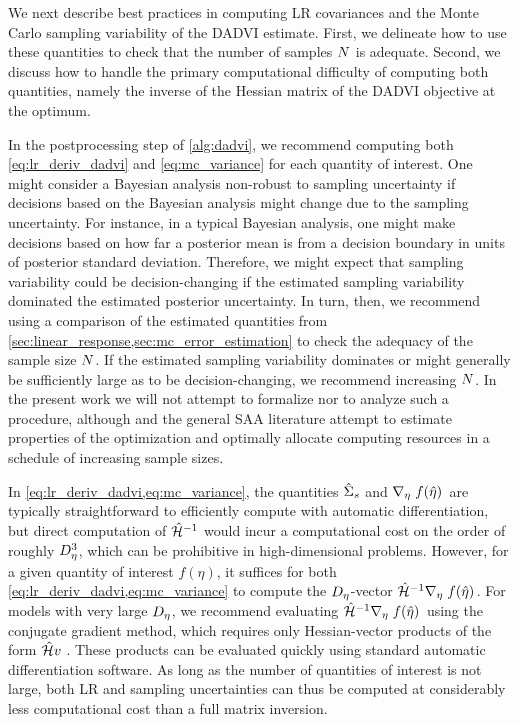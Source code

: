We next describe best practices in computing LR covariances and the Monte Carlo
sampling variability of the DADVI estimate.  First, we delineate how to use
these quantities to check that the number of samples $N$ is adequate.
Second, we discuss how to handle the primary computational difficulty of
computing both quantities, namely the inverse of the Hessian matrix of the DADVI
objective at the optimum.


In the postprocessing step of \cref{alg:dadvi}, we recommend computing both
\cref{eq:lr_deriv_dadvi} and \cref{eq:mc_variance} for each quantity of
interest. One might consider a Bayesian analysis non-robust to sampling
uncertainty if decisions based on the Bayesian analysis might change due to the
sampling uncertainty. For instance, in a typical Bayesian analysis, one might
make decisions based on how far a posterior mean is from a decision boundary in
units of posterior standard deviation. Therefore, we might expect that sampling
variability could be decision-changing if the estimated sampling variability
dominated the estimated posterior uncertainty. In turn, then, we recommend using
a comparison of the estimated quantities from
\cref{sec:linear_response,sec:mc_error_estimation} to check the adequacy of the
sample size $N$. If the estimated sampling variability dominates or might
generally be sufficiently large as to be decision-changing, we recommend
increasing $N$. In the present work we will not attempt to formalize nor to
analyze such a procedure, although \citet{burroni:2023:saabbvi} and the general
SAA literature \citep{royset:2013:optimalsaa, kim:2015:guidetosaa} attempt to
estimate properties of the optimization and optimally allocate computing
resources in a schedule of increasing sample sizes.


In \cref{eq:lr_deriv_dadvi,eq:mc_variance}, the quantities $\hat{\Sigma}_{s}$ and
$\nabla_{\eta} \left. f(\hat{\eta}) \right.$ are typically straightforward to efficiently
compute with automatic differentiation, but direct computation of $\hat{\mathcal{H}}^{-1}$
would incur a computational cost on the order of roughly $D_{\eta}^3$, which can
be prohibitive in high-dimensional problems.  However, for a given quantity of
interest $f(\eta)$, it suffices for both \cref{eq:lr_deriv_dadvi,eq:mc_variance}
to compute the $D_{\eta}$-vector $\hat{\mathcal{H}}^{-1} \nabla_{\eta} \left. f(\hat{\eta}) \right.$. For models
with very large $D_{\eta}$, we recommend evaluating $\hat{\mathcal{H}}^{-1}
\nabla_{\eta} \left. f(\hat{\eta}) \right.$ using the conjugate gradient method, which requires
only Hessian-vector products of the form $\hat{\mathcal{H}} v$ \citep[Chapter
5]{nocedal:1999:optimization}. These products can be evaluated quickly using
standard automatic differentiation software.  As long as the number of
quantities of interest is not large, both LR and sampling uncertainties can thus
be computed at considerably less computational cost than a full matrix
inversion.